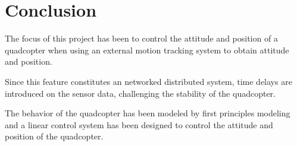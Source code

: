 \chapter{Conclusion}
%
%
%
%
%
%

The focus of this project has been to control the attitude and position of a quadcopter when using an external motion tracking system to obtain attitude and position.

Since this feature constitutes an networked distributed system, time delays are introduced on the sensor data, challenging the stability of the quadcopter.

The behavior of the quadcopter has been modeled by first principles modeling and a linear control system has been designed to control the attitude and position of the quadcopter.


